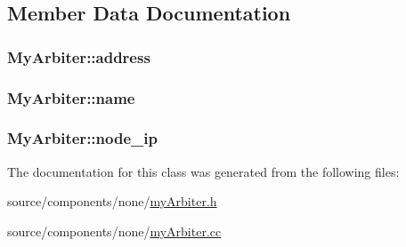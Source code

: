 \subsection{Member Data Documentation}
\hypertarget{classMyArbiter_4e879ce8ea05c997de5a71af66bae3a5}{
\subsubsection[{address}]{ {\bf MyArbiter::address}}}
\label{classMyArbiter_4e879ce8ea05c997de5a71af66bae3a5}


\hypertarget{classMyArbiter_0d635db925d8b449f5978ebeb1cfe923}{
\subsubsection[{name}]{ {\bf MyArbiter::name}}}
\label{classMyArbiter_0d635db925d8b449f5978ebeb1cfe923}


\hypertarget{classMyArbiter_49b1876be705a202c9243f6ec560eae0}{
\subsubsection[{node\_\-ip}]{ {\bf MyArbiter::node\_\-ip}}}
\label{classMyArbiter_49b1876be705a202c9243f6ec560eae0}




The documentation for this class was generated from the following files:\begin{CompactItemize}
\item 
source/components/none/\hyperlink{myArbiter_8h}{myArbiter.h}\item 
source/components/none/\hyperlink{myArbiter_8cc}{myArbiter.cc}\end{CompactItemize}
